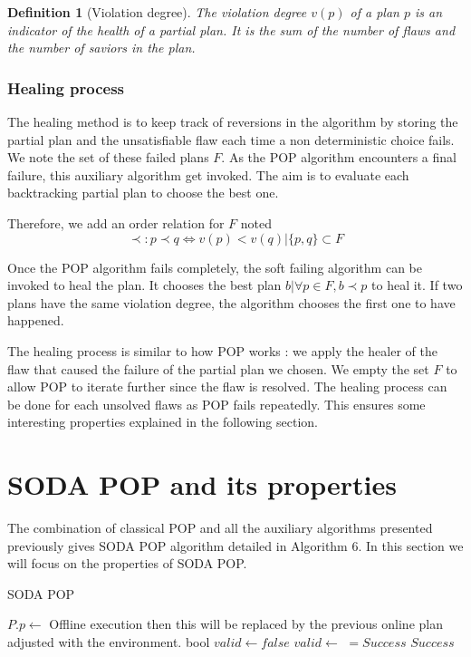 \documentclass[]{article}
\newtheorem{definition}{Definition}
\begin{document}
\begin{definition}[Violation degree]

The violation degree \(v(p)\) of a plan \(p\) is an indicator of the
health of a partial plan. It is the sum of the number of flaws and the
number of saviors in the plan.

\end{definition}

\subsubsection{Healing process}\label{healing-process}

The healing method is to keep track of reversions in the algorithm by
storing the partial plan and the unsatisfiable flaw each time a non
deterministic choice fails. We note the set of these failed plans \(F\).
As the POP algorithm encounters a final failure, this auxiliary
algorithm get invoked. The aim is to evaluate each backtracking partial
plan to choose the best one.

Therefore, we add an order relation for \(F\) noted
\[\prec : p \prec q \iff v(p) < v(q) | \{p, q\} \subset F\]

Once the POP algorithm fails completely, the soft failing algorithm can
be invoked to heal the plan. It chooses the best plan
\(b | \forall p \in F, b \prec p\) to heal it. If two plans have the
same violation degree, the algorithm chooses the first one to have
happened.

The healing process is similar to how POP works : we apply the healer of
the flaw that caused the failure of the partial plan we chosen. We empty
the set \(F\) to allow POP to iterate further since the flaw is
resolved. The healing process can be done for each unsolved flaws as POP
fails repeatedly. This ensures some interesting properties explained in
the following section.

\hypertarget{soda}{\section{SODA POP and its properties}\label{soda}}

The combination of classical POP and all the auxiliary algorithms
presented previously gives SODA POP algorithm detailed in Algorithm 6.
In this section we will focus on the properties of SODA POP.

\begin{algorithm}\caption{SODA POP}\label{soda}\begin{algorithmic}[1]

 \State \(P.p \gets\)
 \Comment Offline execution then this
will be replaced by the previous online plan adjusted with the
environment. \State {} \State bool \(valid \gets false\)
 \State \(valid \gets\) 
\(= Success\)  \State {}
\State \Return \(Success\) \EndIf
        \State {} \EndWhile
\EndFunction

\end{algorithmic}\end{algorithm}
\end{document}
